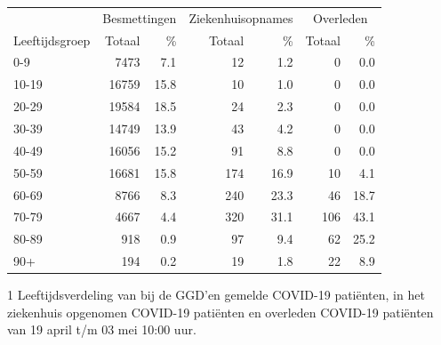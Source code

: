 \documentclass[
  english,
  man,floatsintext]{apa6}
\begin{document}
\begin{table}
\centering\begingroup\fontsize{11}{13}\selectfont

\begin{threeparttable}
\begin{tabular}{lrrrrrr}
\toprule
\multicolumn{1}{c}{ } & \multicolumn{2}{c}{Besmettingen} & \multicolumn{2}{c}{Ziekenhuisopnames} & \multicolumn{2}{c}{Overleden} \\
\cmidrule(l{3pt}r{3pt}){2-3} \cmidrule(l{3pt}r{3pt}){4-5} \cmidrule(l{3pt}r{3pt}){6-7}
Leeftijdsgroep & Totaal & \% & Totaal & \% & Totaal & \%\\
\midrule
0-9 & 7473 & 7.1 & 12 & 1.2 & 0 & 0.0\\
10-19 & 16759 & 15.8 & 10 & 1.0 & 0 & 0.0\\
20-29 & 19584 & 18.5 & 24 & 2.3 & 0 & 0.0\\
30-39 & 14749 & 13.9 & 43 & 4.2 & 0 & 0.0\\
40-49 & 16056 & 15.2 & 91 & 8.8 & 0 & 0.0\\
50-59 & 16681 & 15.8 & 174 & 16.9 & 10 & 4.1\\
60-69 & 8766 & 8.3 & 240 & 23.3 & 46 & 18.7\\
70-79 & 4667 & 4.4 & 320 & 31.1 & 106 & 43.1\\
80-89 & 918 & 0.9 & 97 & 9.4 & 62 & 25.2\\
90+ & 194 & 0.2 & 19 & 1.8 & 22 & 8.9\\
\bottomrule
\end{tabular}
\begin{tablenotes}
\item[1] Leeftijdsverdeling van bij de GGD’en gemelde COVID-19 patiënten, in het ziekenhuis opgenomen COVID-19 patiënten en overleden COVID-19 patiënten van 19 april t/m 03 mei 10:00 uur.
\end{tablenotes}
\end{threeparttable}
\endgroup{}
\end{table}

\newpage
\end{document}
